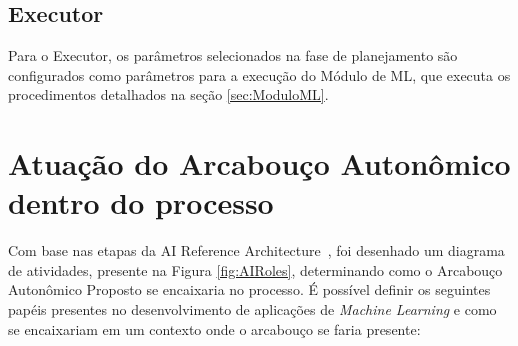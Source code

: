 \documentclass[Portugues,Final]{ic-tese-v3}
\begin{document}
\subsection{Executor}

Para o Executor, os parâmetros selecionados na fase de planejamento são configurados como parâmetros para a execução do Módulo de ML, que executa os procedimentos detalhados na seção \ref{sec:ModuloML}.

\section{Atuação do Arcabouço Autonômico dentro do processo}

Com base nas etapas da AI Reference Architecture~\cite{IBM_2021}, foi desenhado um diagrama de atividades, presente na Figura \ref{fig:AIRoles}, determinando como o Arcabouço Autonômico Proposto se encaixaria no processo. É possível definir os seguintes papéis presentes no desenvolvimento de aplicações de \textit{Machine Learning} e como se encaixariam em um contexto onde o arcabouço se faria presente:
\end{document}
